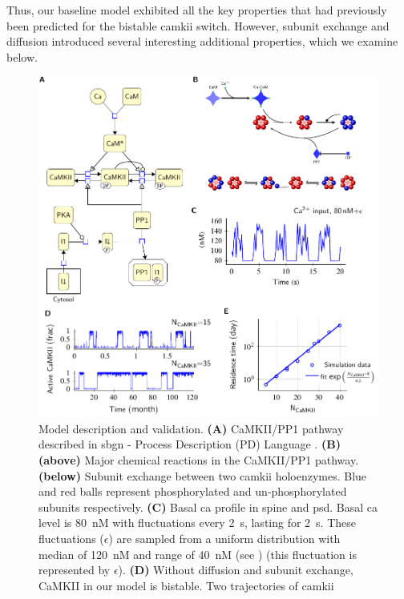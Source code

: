 \documentclass[9pt,lineno,doublespacing]{elife}
\begin{document}
Thus, our baseline model exhibited all the key properties that had
previously been predicted for the bistable \gls{camkii} switch. However, 
subunit exchange and diffusion introduced several interesting additional
properties, which we examine below.

\begin{figure}[t]%
    \includegraphics[width=0.95\linewidth]{./PaperFigures/elifeFigure1/figure_validation_178mm.pdf}
    \caption{Model description and validation. \textbf{(A)} CaMKII/PP1 pathway
        described in \gls{sbgn} - Process Description (PD) Language
        \citep{novere_systems_2009}.  \textbf{(B)} \textbf{(above)} Major
        chemical reactions in the CaMKII/PP1 pathway. \textbf{(below)} Subunit
        exchange between two \gls{camkii} holoenzymes. Blue and red balls
        represent phosphorylated and un-phosphorylated subunits respectively.
        \textbf{(C)} Basal \gls{ca} profile in spine and \gls{psd}. Basal
        \gls{ca} level is \SI{80}{\nano M} with fluctuations every
        \SI{2}{\second}, lasting for \SI{2}{\second}.  These fluctuations
        ($\epsilon$) are sampled from a uniform distribution with median of
        \SI{120}{\nano M} and range  of \SI{40}{\nano M} (see
        ) (this fluctuation is represented by
        $\epsilon$).  \textbf{(D)} Without diffusion and subunit exchange,
        CaMKII in our model is bistable.  Two trajectories of \gls{camkii}
}
\end{figure}
\end{document}

